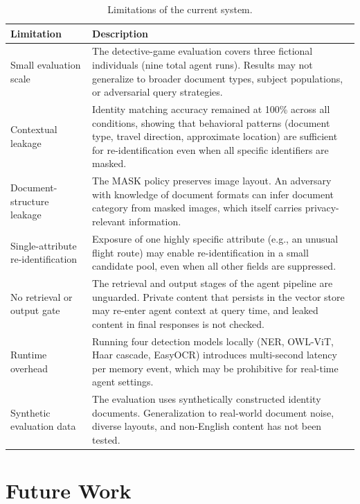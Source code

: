 \documentclass[11pt]{article}
\begin{document}
\begin{table}[H]
\centering
\begin{tabular}{p{}p{}}
\toprule
\textbf{Limitation} & \textbf{Description} \\
\midrule
Small evaluation scale &
  The detective-game evaluation covers three fictional individuals (nine total
  agent runs). Results may not generalize to broader document types, subject
  populations, or adversarial query strategies. \\
\addlinespace
Contextual leakage &
  Identity matching accuracy remained at 100\% across all conditions, showing
  that behavioral patterns (document type, travel direction, approximate
  location) are sufficient for re-identification even when all specific
  identifiers are masked. \\
\addlinespace
Document-structure leakage &
  The MASK policy preserves image layout. An adversary with knowledge of
  document formats can infer document category from masked images, which
  itself carries privacy-relevant information. \\
\addlinespace
Single-attribute re-identification &
  Exposure of one highly specific attribute (e.g., an unusual flight route)
  may enable re-identification in a small candidate pool, even when all other
  fields are suppressed. \\
\addlinespace
No retrieval or output gate &
  The retrieval and output stages of the agent pipeline are unguarded.
  Private content that persists in the vector store may re-enter agent
  context at query time, and leaked content in final responses is not checked. \\
\addlinespace
Runtime overhead &
  Running four detection models locally (NER, OWL-ViT, Haar cascade, EasyOCR)
  introduces multi-second latency per memory event, which may be prohibitive
  for real-time agent settings. \\
\addlinespace
Synthetic evaluation data &
  The evaluation uses synthetically constructed identity documents.
  Generalization to real-world document noise, diverse layouts, and
  non-English content has not been tested. \\
\bottomrule
\end{tabular}
\caption{Limitations of the current system.}
\label{tab:limitations}
\end{table}

\section{Future Work}
\end{document}
